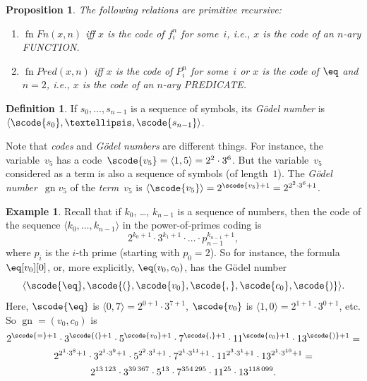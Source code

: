 \documentclass[10pt,a4paper]{article}
\newcommand*{\olup}[1]{\MakeUppercase{#1}}
\theoremstyle{plain}
\newtheorem{prop}[thm]{Proposition}
\theoremstyle{definition}
\newtheorem{defn}[thm]{Definition}
\newtheorem{ex}[thm]{Example}
\theoremstyle{remark}
\newenvironment{explain}{}{}
\providecommand{\Obj}{}
\providecommand{\tuple}[1]{\langle #1 \rangle}
\providecommand{\Gn}{\operatorname{gn}}
\providecommand{\fn}{\operatorname{fn}}
\begin{document}
\begin{prop}
The following relations are primitive recursive:
\begin{enumerate}
\item $\fn{Fn}(x, n)$ iff $x$ is the code of $\Obj f^n_i$ for
  some~$i$, i.e., $x$ is the code of an $n$-ary \olup{function}.
\item $\fn{Pred}(x, n)$ iff $x$ is the code of $\Obj P^n_i$ for
  some~$i$ or $x$ is the code of $\eq$ and $n = 2$, i.e., $x$ is the
  code of an $n$-ary \olup{predicate}.
\end{enumerate}
\end{prop}

\begin{defn}
If $s_0, \dots, s_{n-1}$ is a sequence of symbols, its \emph{G\"odel
  number} is $\tuple{\scode{s_0}, \dots, \scode{s_{n-1}}}$.
\end{defn}

\begin{explain}
Note that \emph{codes} and \emph{G\"odel numbers} are different
things. For instance, the variable~$\Obj v_5$ has a code~$\scode{\Obj
  v_5} = \tuple{1, 5} = 2^2\cdot 3^6$. But the variable~$\Obj v_5$
considered as a term is also a sequence of symbols (of
length~$1$). The \emph{G\"odel number}~$\Gn{\Obj v_5}$ of the
\emph{term}~$\Obj v_5$ is $\tuple{\scode{\Obj v_5}} = 2^{\scode{\Obj
    v_5} + 1} = 2^{2^2\cdot 3^6 + 1}$.
\end{explain}

\begin{ex}
Recall that if $k_0$, \dots, $k_{n-1}$ is a sequence of numbers, then
the code of the sequence $\tuple{k_0, \dots, k_{n-1}}$ in the
power-of-primes coding is
\[
2^{k_0+1}\cdot3^{k_1+1}\cdot \dots \cdot p_{n-1}^{k_{n-1}+1},
\]
where $p_i$ is the $i$-th prime (starting with $p_0 = 2$). So for
instance, the formula $\eq[\Obj v_0][\Obj 0]$, or, more explicitly,
${\eq}(\Obj v_0,\Obj c_0)$, has the G\"odel number
\[
\tuple{\scode{\eq},\scode{(},\scode{\Obj v_0},\scode{,}, \scode{\Obj
    c_0},\scode{)}}.
\]
Here, $\scode{\eq}$ is $\tuple{0,7} = 2^{0+1}\cdot
3^{7+1}$, $\scode{\Obj v_0}$ is $\tuple{1,0} = 2^{1+1}\cdot3^{0+1}$,
etc. So $\Gn{=(\Obj v_0,\Obj c_0)}$ is
\begin{multline*}
2^{\scode{=} + 1}\cdot 3^{\scode{(}+1}\cdot 5^{\scode{\Obj v_0}+1}
\cdot 7^{\scode{,} + 1} \cdot 11^{\scode{\Obj c_0}+1} \cdot
13^{\scode{)}+1} = \\
2^{2^1\cdot 3^8 + 1}\cdot 3^{2^1\cdot 3^9+1}\cdot 5^{2^2\cdot 3^1+1}
\cdot 7^{2^1\cdot 3^{11} + 1} \cdot 11^{2^3\cdot3^1+1} \cdot
13^{2^1\cdot3^{10}+1} = \\
2^{13\,123}\cdot 3^{39\,367}\cdot 5^{13}\cdot 7^{354\,295}\cdot11^{25}\cdot13^{118\,099}.
\end{multline*}
\end{ex}
\end{document}
